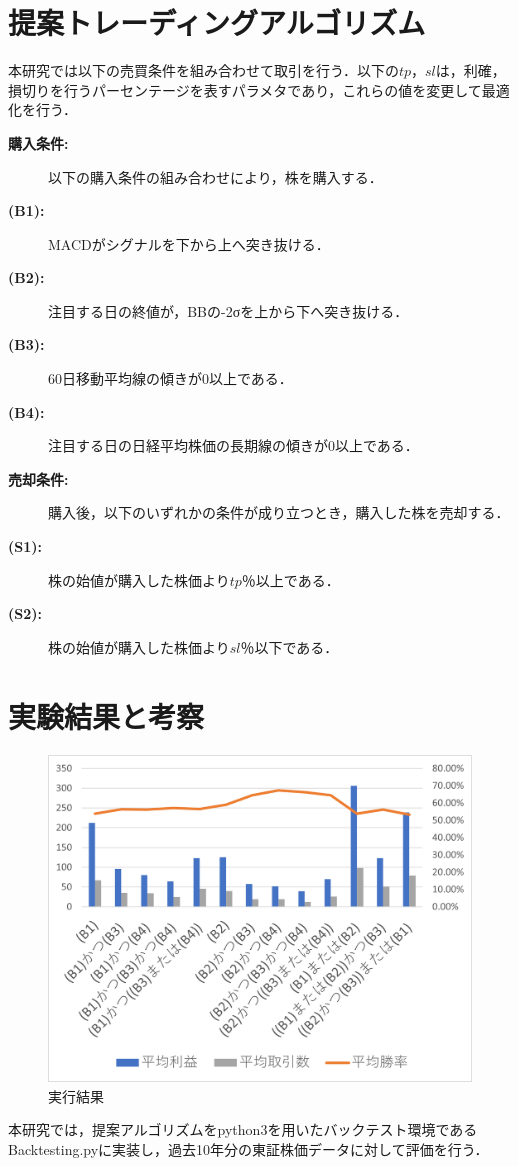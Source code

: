 \documentclass[dvipdfmx,a4paper,twocolumn,10pt]{jarticle}
\begin{document}
\section{提案トレーディングアルゴリズム}
本研究では以下の売買条件を組み合わせて取引を行う．以下の$tp$，$sl$は，利確，損切りを行うパーセンテージを表すパラメタであり，これらの値を変更して最適化を行う．

\begin{description}
\item[\textbf{購入条件:}]以下の購入条件の組み合わせにより，株を購入する．


\item[\textbf{(B1):}] MACDがシグナルを下から上へ突き抜ける．
\item[\textbf{(B2):}] 注目する日の終値が，BBの-2σを上から下へ突き抜ける．
\item[\textbf{(B3):}] 60日移動平均線の傾きが0以上である．
\item[\textbf{(B4):}] 注目する日の日経平均株価の長期線の傾きが0以上である．

\item[\textbf{売却条件:}]購入後，以下のいずれかの条件が成り立つとき，購入した株を売却する．

\item[\textbf{(S1):}] 株の始値が購入した株価より$tp$％以上である．
\item[\textbf{(S2):}] 株の始値が購入した株価より$sl$％以下である．

\end{description}

\section{実験結果と考察}
\begin{figure}[t]
  \centering
  \includegraphics[page=4，width=\linewidth,scale=0.5]{graph.png}
  \caption{実行結果}
  \label{fig:result}
 \end{figure}
 本研究では，提案アルゴリズムをpython3を用いたバックテスト環境であるBacktesting.pyに実装し，過去10年分の東証株価データに対して評価を行う．
 
\end{document}
